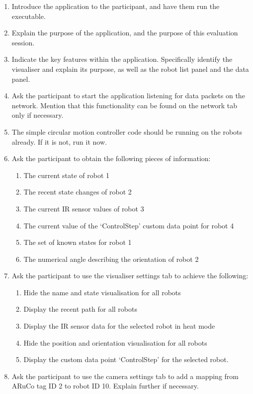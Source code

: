 \begin{enumerate}
 \item Introduce the application to the participant, and have them run the executable.
 \item Explain the purpose of the application, and the purpose of this evaluation session.
 \item Indicate the key features within the application. Specifically identify the visualiser and explain its purpose, as well as the robot list panel and the data panel.
 \item Ask the participant to start the application listening for data packets on the network. Mention that this functionality can be found on the network tab only if necessary.
 \item The simple circular motion controller code should be running on the robots already. If it is not, run it now.
 \item Ask the participant to obtain the following pieces of information:
 \begin{enumerate}
  \item The current state of robot 1
  \item The recent state changes of robot 2
  \item The current IR sensor values of robot 3
  \item The current value of the `ControlStep' custom data point for robot 4
  \item The set of known states for robot 1
  \item The numerical angle describing the orientation of robot 2
 \end{enumerate}
 \item Ask the participant to use the visualiser settings tab to achieve the following:
 \begin{enumerate}
  \item Hide the name and state visualisation for all robots
  \item Display the recent path for all robots
  \item Display the IR sensor data for the selected robot in heat mode
  \item Hide the position and orientation visualisation for all robots
  \item Display the custom data point `ControlStep' for the selected robot.
 \end{enumerate}
 \item Ask the participant to use the camera settings tab to add a mapping from ARuCo tag ID 2 to robot ID 10. Explain further if necessary.

\end{enumerate}
